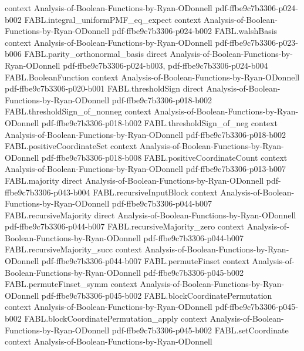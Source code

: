 \begin{theorem}
  {context}
  {Analysis-of-Boolean-Functions-by-Ryan-ODonnell}
  {pdf-ffbe9c7b3306-p024-b002}
\proofstep
  {FABL.integral_uniformPMF_eq_expect}
  {context}
  {Analysis-of-Boolean-Functions-by-Ryan-ODonnell}
  {pdf-ffbe9c7b3306-p024-b002}
\proofstep
  {FABL.walshBasis}
  {context}
  {Analysis-of-Boolean-Functions-by-Ryan-ODonnell}
  {pdf-ffbe9c7b3306-p023-b006}
\proofstep
  {FABL.parity_orthonormal_basis}
  {direct}
  {Analysis-of-Boolean-Functions-by-Ryan-ODonnell}
  {pdf-ffbe9c7b3306-p024-b003,
    pdf-ffbe9c7b3306-p024-b004}
\proofstep
  {FABL.BooleanFunction}
  {context}
  {Analysis-of-Boolean-Functions-by-Ryan-ODonnell}
  {pdf-ffbe9c7b3306-p020-b001}
\proofstep
  {FABL.thresholdSign}
  {direct}
  {Analysis-of-Boolean-Functions-by-Ryan-ODonnell}
  {pdf-ffbe9c7b3306-p018-b002}
\proofstep
  {FABL.thresholdSign_of_nonneg}
  {context}
  {Analysis-of-Boolean-Functions-by-Ryan-ODonnell}
  {pdf-ffbe9c7b3306-p018-b002}
\proofstep
  {FABL.thresholdSign_of_neg}
  {context}
  {Analysis-of-Boolean-Functions-by-Ryan-ODonnell}
  {pdf-ffbe9c7b3306-p018-b002}
\proofstep
  {FABL.positiveCoordinateSet}
  {context}
  {Analysis-of-Boolean-Functions-by-Ryan-ODonnell}
  {pdf-ffbe9c7b3306-p018-b008}
\proofstep
  {FABL.positiveCoordinateCount}
  {context}
  {Analysis-of-Boolean-Functions-by-Ryan-ODonnell}
  {pdf-ffbe9c7b3306-p013-b007}
\proofstep
  {FABL.majority}
  {direct}
  {Analysis-of-Boolean-Functions-by-Ryan-ODonnell}
  {pdf-ffbe9c7b3306-p043-b004}
\proofstep
  {FABL.recursiveInputBlock}
  {context}
  {Analysis-of-Boolean-Functions-by-Ryan-ODonnell}
  {pdf-ffbe9c7b3306-p044-b007}
\proofstep
  {FABL.recursiveMajority}
  {direct}
  {Analysis-of-Boolean-Functions-by-Ryan-ODonnell}
  {pdf-ffbe9c7b3306-p044-b007}
\proofstep
  {FABL.recursiveMajority_zero}
  {context}
  {Analysis-of-Boolean-Functions-by-Ryan-ODonnell}
  {pdf-ffbe9c7b3306-p044-b007}
\proofstep
  {FABL.recursiveMajority_succ}
  {context}
  {Analysis-of-Boolean-Functions-by-Ryan-ODonnell}
  {pdf-ffbe9c7b3306-p044-b007}
\proofstep
  {FABL.permuteFinset}
  {context}
  {Analysis-of-Boolean-Functions-by-Ryan-ODonnell}
  {pdf-ffbe9c7b3306-p045-b002}
\proofstep
  {FABL.permuteFinset_symm}
  {context}
  {Analysis-of-Boolean-Functions-by-Ryan-ODonnell}
  {pdf-ffbe9c7b3306-p045-b002}
\proofstep
  {FABL.blockCoordinatePermutation}
  {context}
  {Analysis-of-Boolean-Functions-by-Ryan-ODonnell}
  {pdf-ffbe9c7b3306-p045-b002}
\proofstep
  {FABL.blockCoordinatePermutation_apply}
  {context}
  {Analysis-of-Boolean-Functions-by-Ryan-ODonnell}
  {pdf-ffbe9c7b3306-p045-b002}
\proofstep
  {FABL.setCoordinate}
  {context}
  {Analysis-of-Boolean-Functions-by-Ryan-ODonnell}

\end{theorem}
